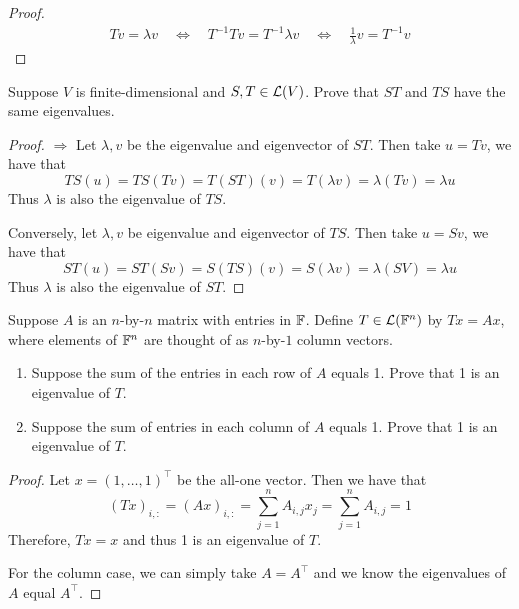 \documentclass{extarticle}
\begin{document}
\begin{proof}
\begin{align*}
    Tv = \lambda v \quad \Longleftrightarrow \quad 
    T^{-1} T v = T^{-1} \lambda v \quad \Longleftrightarrow \quad
    \frac{1}{\lambda} v = T^{-1} v   
\end{align*}
\end{proof}

\begin{problem}{23}
    Suppose \(V\) is finite-dimensional and \(S, T \in \mathcal{L}(V)\). Prove that \(ST\) and \(TS\)
    have the same eigenvalues. 
\end{problem}

\begin{proof}
\(\Rightarrow\) Let \(\lambda, v\) be the eigenvalue and eigenvector of \(ST\). Then take 
\(u = Tv\), we have that 
\[TS(u) = TS(Tv) = T(ST)(v) = T (\lambda v) = \lambda (Tv) = \lambda u\]
Thus \(\lambda\) is also the eigenvalue of \(TS\). 

Conversely, let \(\lambda, v\) be eigenvalue and eigenvector of \(TS\). Then take 
\(u = Sv\), we have that 
\[ST(u) = ST(Sv) = S(TS) (v) = S(\lambda v) = \lambda (SV) = \lambda u\]
Thus \(\lambda\) is also the eigenvalue of \(ST\). 
\end{proof}

\begin{problem}{24}
    Suppose \(A\) is an \(n\)-by-\(n\) matrix with entries in \(\mathbb{F}\). Define 
    \(T \in \mathcal{L}(\mathbb{F}^n)\) by \(Tx = Ax\), where elements of \(\mathbb{F}^n\) are thought of 
    as \(n\)-by-\(1\) column vectors. 
    \begin{enumerate}[label=(\alph*)]
        \item Suppose the sum of the entries in each row of \(A\) equals 1. Prove that 
        1 is an eigenvalue of \(T\).
        \item Suppose the sum of entries in each column of \(A\) equals 1. Prove that 
        1 is an eigenvalue of \(T\).
    \end{enumerate}
\end{problem}

\begin{proof}
Let \(x = (1, \ldots, 1)^\top\) be the all-one vector. Then we have that 
\[(Tx)_{i, \colon} = (Ax)_{i, \colon} = \sum_{j=1}^{n} A_{i, j} x_j = \sum_{j=1}^{n} A_{i, j} = 1\]
Therefore, \(Tx = x\) and thus 1 is an eigenvalue of \(T\). 

For the column case, we can simply take \(A = A^\top\) and we know the eigenvalues of \(A\) equal 
\(A^\top\). 
\end{proof}
\end{document}
